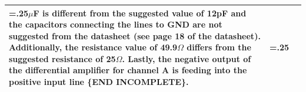 \begin{tabularx}{\textwidth}{>{\hsize=.25\hsize} X >{\hsize=.25\hsize} XX}
                                            0.1$\mu$F is different from the suggested value of 12pF
                                            and the capacitors connecting the lines to GND are not
                                            suggested from the datasheet (see page 18 of the
                                            datasheet). Additionally, the resistance value of
                                            49.9$\Omega$ differs from the suggested resistance of
                                            25$\Omega$. Lastly, the negative output of the
                                            differential amplifier for channel A is feeding into the
                                            positive input line \textbf{\{END INCOMPLETE\}}. \\

  \bottomrule
\end{tabularx}